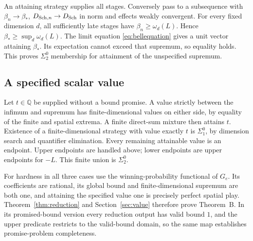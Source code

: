An attaining strategy supplies all stages. Conversely pass to a subsequence with $\beta_n\to\beta_*$, $D_{{\rm Sch},n}\to D_{\rm Sch}$ in norm and effects weakly convergent. For every fixed dimension $d$, all sufficiently late stages have $\beta_n\geq\omega_d(L)$. Hence $\beta_*\geq\sup_d\omega_d(L)$. The limit equation \eqref{eq:bellequation} gives a unit vector attaining $\beta_*$. Its expectation cannot exceed that supremum, so equality holds. This proves $\Sigma^0_2$ membership for attainment of the unspecified supremum.

\subsection{A specified scalar value}
Let $t\in\mathbb Q$ be supplied without a bound promise. A value strictly between the infimum and supremum has finite-dimensional values on either side, by equality of the finite and spatial extrema. A finite direct-sum mixture then attains $t$. Existence of a finite-dimensional strategy with value exactly $t$ is $\Sigma^0_1$, by dimension search and quantifier elimination. Every remaining attainable value is an endpoint. Upper endpoints are handled above; lower endpoints are upper endpoints for $-L$. This finite union is $\Sigma^0_2$.

For hardness in all three cases use the winning-probability functional of $G_e$. Its coefficients are rational, its global bound and finite-dimensional supremum are both one, and attaining the specified value one is precisely perfect spatial play. Theorem~\ref{thm:reduction} and Section~\ref{sec:value} therefore prove Theorem~B. In its promised-bound version every reduction output has valid bound $1$, and the upper predicate restricts to the valid-bound domain, so the same map establishes promise-problem completeness.
